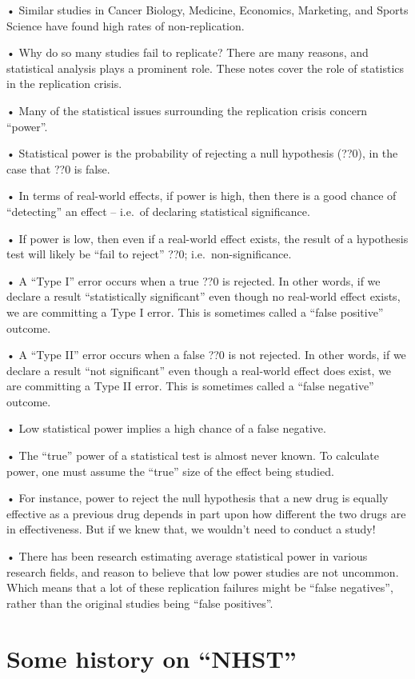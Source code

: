 \documentclass[
  letterpaper,
  DIV=11,
  numbers=noendperiod]{scrreprt}
\begin{document}
• Similar studies in Cancer Biology, Medicine, Economics, Marketing, and
Sports Science have found high rates of non-replication.

• Why do so many studies fail to replicate? There are many reasons, and
statistical analysis plays a prominent role. These notes cover the role
of statistics in the replication crisis.

• Many of the statistical issues surrounding the replication crisis
concern ``power''.

• Statistical power is the probability of rejecting a null hypothesis
(??0), in the case that ??0 is false.

• In terms of real-world effects, if power is high, then there is a good
chance of ``detecting'' an effect -- i.e.~of declaring statistical
significance.

• If power is low, then even if a real-world effect exists, the result
of a hypothesis test will likely be ``fail to reject'' ??0;
i.e.~non-significance.

• A ``Type I'' error occurs when a true ??0 is rejected. In other words,
if we declare a result ``statistically significant'' even though no
real-world effect exists, we are committing a Type I error. This is
sometimes called a ``false positive'' outcome.

• A ``Type II'' error occurs when a false ??0 is not rejected. In other
words, if we declare a result ``not significant'' even though a
real-world effect does exist, we are committing a Type II error. This is
sometimes called a ``false negative'' outcome.

• Low statistical power implies a high chance of a false negative.

• The ``true'' power of a statistical test is almost never known. To
calculate power, one must assume the ``true'' size of the effect being
studied.

• For instance, power to reject the null hypothesis that a new drug is
equally effective as a previous drug depends in part upon how different
the two drugs are in effectiveness. But if we knew that, we wouldn't
need to conduct a study!

• There has been research estimating average statistical power in
various research fields, and reason to believe that low power studies
are not uncommon. Which means that a lot of these replication failures
might be ``false negatives'', rather than the original studies being
``false positives''.

\hypertarget{some-history-on-nhst}{%
\section{Some history on ``NHST''}\label{some-history-on-nhst}}
\end{document}
